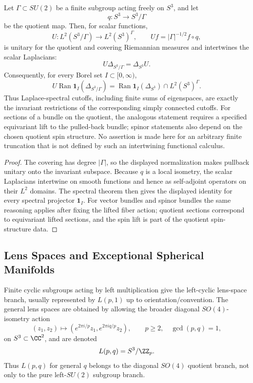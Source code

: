 \documentclass[11pt]{article}
\begin{document}
\begin{proposition}
\label{p1:prop:quotient-invariant-restriction}
Let \(\Gamma\subset SU(2)\) be a finite subgroup acting freely on \(S^3\), and let
\[
q:S^3\to S^3/\Gamma
\]
be the quotient map. Then, for scalar functions,
\[
U:L^2(S^3/\Gamma)\longrightarrow L^2(S^3)^\Gamma,
\qquad
Uf=|\Gamma|^{-1/2}f\circ q,
\]
is unitary for the quotient and covering Riemannian measures and intertwines the
scalar Laplacians:
\[
U\Delta_{S^3/\Gamma}=\Delta_{S^3}U.
\]
Consequently, for every Borel set $I\subset[0,\infty)$,
\[
U\operatorname{Ran}\mathbf1_I(\Delta_{S^3/\Gamma})
=
\operatorname{Ran}\mathbf1_I(\Delta_{S^3})\cap L^2(S^3)^\Gamma.
\]
Thus Laplace-spectral cutoffs, including finite sums of eigenspaces, are exactly
the invariant restrictions of the corresponding simply connected cutoffs.
For sections of a bundle on the quotient, the analogous statement requires a
specified equivariant lift to the pulled-back bundle; spinor statements also
depend on the chosen quotient spin structure.  No assertion is made here for
an arbitrary finite truncation that is not defined by such an intertwining
functional calculus.
\end{proposition}

\begin{proof}
The covering has degree $|\Gamma|$, so the displayed normalization makes
pullback unitary onto the invariant subspace.  Because $q$ is a local
isometry, the scalar Laplacians intertwine on smooth functions and hence as
self-adjoint operators on their $L^2$ domains.  The spectral theorem then gives
the displayed identity for every spectral projector $\mathbf1_I$.  For vector
bundles and spinor bundles the same reasoning applies after fixing the lifted
fiber action; quotient sections correspond to equivariant lifted sections, and
the spin lift is part of the quotient spin-structure data.
\end{proof}


\subsection{Lens Spaces and Exceptional Spherical Manifolds}

Finite cyclic subgroups acting by left multiplication give the left-cyclic lens-space branch, usually represented by \(L(p,1)\) up to orientation/convention.  The general lens spaces are obtained by allowing the broader diagonal \(SO(4)\)-isometry action
\[
(z_1,z_2)\longmapsto (e^{2\pi i/p}z_1,e^{2\pi i q/p}z_2),
\qquad p\ge2,\quad \gcd(p,q)=1,
\]
on \(S^3\subset\CC^2\), and are denoted
\[
L(p,q)=S^3/\ZZ_p.
\]
Thus \(L(p,q)\) for general \(q\) belongs to the diagonal \(SO(4)\) quotient branch, not only to the pure left-\(SU(2)\) subgroup branch.
\end{document}
